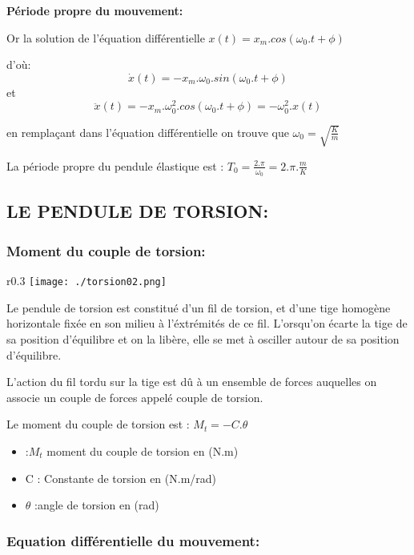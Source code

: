 \documentclass[12pt]{article}
\begin{document}
\textbf{Période propre du mouvement: }

Or la solution de l'équation différentielle $x(t) = x_m.cos(\omega_0.t + \phi)$ 

d’où: $$\dot{x}(t) = -x_m.\omega_0.sin(\omega_0.t + \phi)$$ et $$\ddot{x}(t) = -x_m.\omega_0^2.cos(\omega_0.t + \phi) = -\omega_0^2 . x(t)$$

en remplaçant dans l'équation différentielle on trouve que $\omega_0 = \sqrt{\frac{K}{m}}$

La période propre du pendule élastique est : $T_0  = \frac{2.\pi}{\omega_0} = 2.\pi.\frac{m}{K}$

\subsection{LE PENDULE DE TORSION:}

\subsubsection{Moment du couple de torsion:}
\begin{wrapfigure}{r}{0.3\textwidth}
	\vspace{-2cm}
	\texttt{[image: ./torsion02.png]}
\end{wrapfigure}


Le pendule de torsion est constitué d'un fil de torsion, et d'une tige homogène horizontale fixée en son milieu à l'éxtrémités de ce
fil. L'orsqu'on écarte la tige de sa position d'équilibre et on la libère, elle se met à osciller autour de sa position d'équilibre.


L'action du fil tordu sur la tige est dû à un ensemble de forces auquelles on associe un couple de forces appelé couple de torsion.

Le moment du couple de torsion est : $M_t = - C. \theta$

\begin{itemize}

	\item :$M_t$ moment du couple de torsion en (N.m)

	\item C  : Constante de torsion en (N.m/rad)

	\item $\theta $ :angle de torsion en (rad)
\end{itemize}

\subsubsection{Equation différentielle du mouvement: }
\end{document}
